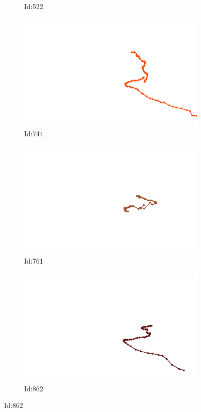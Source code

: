 \documentclass[12pt,twoside]{report}
\begin{document}
\begin{figure}
\begin{subfigure}[b]{0.20\textwidth}
\caption{Id:522}
\end{subfigure}
\begin{subfigure}[b]{0.20\textwidth}
\centering
\includegraphics[width=\textwidth]{../../trajectories/744.png}
\caption{Id:744}
\end{subfigure}
\begin{subfigure}[b]{0.20\textwidth}
\centering
\includegraphics[width=\textwidth]{../../trajectories/761.png}
\caption{Id:761}
\end{subfigure}
\begin{subfigure}[b]{0.20\textwidth}
\centering
\includegraphics[width=\textwidth]{../../trajectories/862.png}
\caption{Id:862}
\end{subfigure}
\end{figure}
\end{document}
